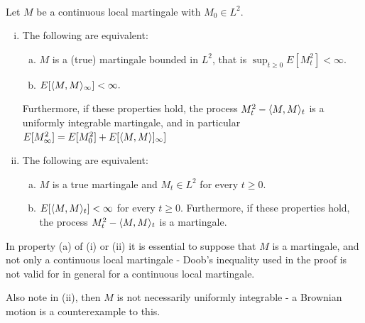 \begin{theorem} \label{chap4.3:theorem-L2_bounded_martingales_and_quadratic_variation}
 \\
Let $M$ be a continuous local martingale with $M_0 \in L^2$.
\begin{enumerate}[(i)]
    \item The following are equivalent:
    \begin{enumerate}[(a)]
        \item $M$ is a (true) martingale bounded in $L^2$, that is $\sup_{t \geq 0}E[M_t^2]< \infty$.
        \item $E[\langle M,M\rangle_\infty]<\infty.$
    \end{enumerate}
    Furthermore, if these properties hold, the process $M_t^2-\langle M,M\rangle_t$ is a uniformly integrable martingale, and in particular $E[M^2_\infty]=E[M_0^2]+E[\langle M,M\rangle]_\infty]$
    \item The following are equivalent:
    \begin{enumerate}[(a)]
        \item $M$ is a true martingale and $M_t \in L^2$ for every $t \geq 0$.
        \item $E[\langle M,M\rangle_t]<\infty$ for every $t \geq 0$.
        Furthermore, if these properties hold, the process $M_t^2-\langle M,M\rangle_t$ is a martingale.
    \end{enumerate}
\end{enumerate}
\end{theorem}
\begin{remark}\label{chap4.3:remark-remarks_on_bounded_L2_continuous_local_martingals_and_quadratic_variation}
In property (a) of (i) or (ii) it is essential to suppose that $M$ is a martingale, and not only a continuous local martingale - Doob's inequality used in the proof is not valid for in general for a continuous local martingale.


Also note in (ii), then $M$ is not necessarily uniformly integrable - a Brownian motion is a counterexample to this.
\end{remark}

